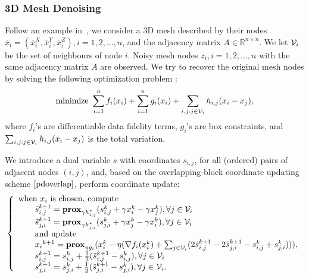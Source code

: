 \subsubsection{3D Mesh Denoising}
Follow an example in~\cite{repetti2015random}, we consider a 3D mesh described by their nodes $\bar{x}_i=(\bar{x}_i^X,\bar{x}_i^Y,\bar{x}_i^Z), i=1,2,...,n$, and the adjacency matrix $A\in\mathbb{R}^{n\times n}$. We let ${\mathcal{V}}_i$  be the set of neighbours of node $i$. Noisy mesh nodes $z_i, i=1,2,...,n$  with the same adjacency matrix $A$ are observed. We try to recover the original mesh nodes by solving the following optimization problem \cite{repetti2015random}:
\begin{equation}
\text{minimize} ~\sum_{i=1}^n f_i(x_i)+\sum_{i=1}^n g_i(x_i)+\sum_{i,j:j\in \cV_{i}} h_{i,j}(x_{i}-x_{j}),
\end{equation}
where $f_i$'s are differentiable data fidelity terms, $g_i$'s are box constraints, and $\sum_{i,j:j\in {\mathcal{V}}_{i}} h_{i,j}(x_{i}-x_{j})$ is the total variation.

We introduce a dual variable $s$ with coordinates $s_{i,j}$, for all (ordered) pairs of adjacent nodes $(i,j)$, and, based on the overlapping-block coordinate updating scheme $\eqref{pdoverlap}$, perform coordinate update:
\begin{equation}
\left\{
\begin{array}{l}
\text{when }x_i\text{ is chosen, compute}\\
\qquad \tilde{s}_{i,j}^{k+1}=\prox_{\gamma h_{i,j}^*} (s_{i,j}^k+\gamma x_i^k-\gamma x_j^k),\forall j\in\cV_i\\
\qquad \tilde{s}_{j,i}^{k+1}=\prox_{\gamma h_{j,i}^*} (s_{j,i}^k+\gamma x_j^k-\gamma x_i^k),\forall j\in\cV_i\\
\qquad \textnormal{and update}\\
\qquad {x_i}^{k+1}=\prox_{\eta g_i}(x_i^k-\eta(\nabla f_i(x_i^k)+\sum_{j\in\cV_i}(2\tilde{s}_{i,j}^{k+1}-2\tilde{s}_{j,i}^{k+1}-s_{i,j}^k+{s}_{j,i}^{k}))),\\
\qquad s_{i,j}^{k+1}=s_{i,j}^k+\frac{1}{2}(\tilde{s}_{i,j}^{k+1}-s_{i,j}^k),\forall j\in\cV_i\\
\qquad s_{j,i}^{k+1}=s_{j,i}^k+\frac{1}{2}(\tilde{s}_{j,i}^{k+1}-s_{j,i}^k),\forall j\in\cV_i.
\end{array}
\right.\nonumber
\end{equation}
